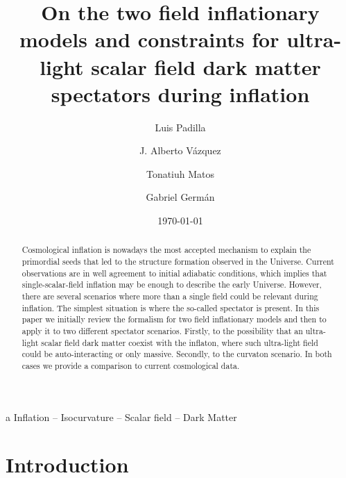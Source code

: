\documentclass[amssymb,twocolumn,prd,nofootinbib,showpacs]{revtex4-1}
\begin{document}
\title{On the two field inflationary models and constraints for ultra-light scalar field dark matter spectators during inflation}
\author{Luis Padilla}  
   \author{J. Alberto V\'azquez}  
\author{Tonatiuh Matos}  
   \author{Gabriel Germ\'an}  

\date{\today}

\begin{abstract}
Cosmological inflation is nowadays the most accepted mechanism to explain the  primordial seeds 
that led to  the structure formation observed in the Universe. Current observations are in well agreement 
to initial adiabatic conditions, which implies that  single-scalar-field inflation may be enough to describe 
the early Universe. 
%
However, there are several scenarios where more than a single field could be relevant during inflation. 
The simplest situation is where the so-called spectator is present. 
In this paper we initially review the formalism for two field inflationary models and then to apply it to two different 
spectator scenarios. Firstly, to the possibility that an ultra-light scalar field dark matter coexist with the inflaton, 
where such ultra-light field could be auto-interacting or only massive. Secondly, to the curvaton scenario.
In both cases we provide a comparison to current cosmological data.    

\end{abstract}
\begin{keywords}
a Inflation  --  Isocurvature  --  Scalar field -- Dark Matter
\end{keywords}

\maketitle


\section{Introduction}
\label{introduction}
\end{document}
